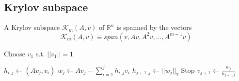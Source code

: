 \subsection{Krylov subspace}

A Krylov subspace \(\mathcal{K}_m(A,v)\) of \(\mathbb{R}^n\) is spanned by the vectors
    \[\mathcal{K}_m(A,v)\equiv span(v,Av,A^2v,\ldots,A^{m-1}v)\]


\begin{algorithm}
\caption{Arnoldi Iterations \cite{Saad2003}}\label{alg: Arnoldi}
\begin{algorithmic}
    \Require Choose \(v_1\) s.t. \(||v_1||=1\)

            \State \(h_{i,j} \gets (Av_j,v_i)\)
        \EndFor
        \State \(w_j \gets Av_j-\sum_{i=1}^{j}h_{i,j}v_i\)
        \State \(h_{j+1,j}\gets ||w_j||_2\)
           \State Stop
        \EndIf
        \State\(v_{j+1}\gets\frac{w_j}{h_{j+1,j}}\)
    \EndFor
\end{algorithmic}
\end{algorithm}